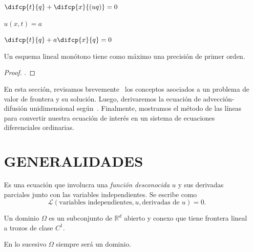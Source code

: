 \begin{math}
    \difcp{t}{q}+
    \difcp{x}{\left(uq\right)}=0
\end{math}

$u\left(x,t\right)=a$

\begin{math}
    \difcp{t}{q}+
    a\difcp{x}{q}=0
\end{math}

\begin{theorem}
    Un esquema lineal monótono tiene como máximo una precisión de
    primer orden.
\end{theorem}

\begin{proof}
    .
\end{proof}

En esta sección, revisamos
brevemente~\citep{Choksi2022,Salgado2022} los
conceptos asociados a un problema de valor de frontera y su solución.
Luego, derivaremos la ecuación de advección-difusión unidimensional
según~\citep{LeVeque1992}.
Finalmente, mostramos el método de las líneas para convertir nuestra
ecuación de interés en un sistema de ecuaciones diferenciales
ordinarias.

\section{GENERALIDADES}

\begin{definition}
    Es una ecuación que involucra una \emph{función desconocida} $u$
    y sus derivadas parciales junto con las variables independientes.
    Se escribe como
    \begin{equation}
        \mathcal{L}
        \left(
        \text{variables independientes},
        u,
        \text{derivadas de $u$}
        \right)
        =0.
        \label{eq:pde}
    \end{equation}
\end{definition}

\begin{definition}[Dominio]
    Un dominio $\Omega$ es un subconjunto de $\mathbb{R}^{d}$ abierto
    y conexo que tiene frontera lineal a trozos de clase $C^{1}$.
\end{definition}

En lo sucesivo $\Omega$ siempre será un dominio.

